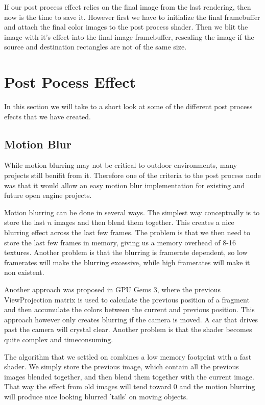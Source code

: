
If our post process effect relies on the final image from the last
rendering, then now is the time to save it. However first we have to
initialize the final framebuffer and attach the final color images to
the post process shader. Then we blit the image with it's effect into
the final image framebuffer, rescaling the image if the source and
destination rectangles are not of the same size.


\section{Post Pocess Effect}

In this section we will take to a short look at some of the different
post process efects that we have created.

\subsection{Motion Blur}

While motion blurring may not be critical to outdoor environments,
many projects still benifit from it. Therefore one of the criteria
to the post process node was that it would allow an easy motion blur
implementation for existing and future open engine projects.

Motion blurring can be done in several ways. The simplest way
conceptually is to store the last $n$ images and then blend them
together. This creates a nice blurring effect across the last few
frames. The problem is that we then need to store the last few frames
in memory, giving us a memory overhead of 8-16 textures. Another
problem is that the blurring is framerate dependent, so low framerates
will make the blurring excessive, while high framerates will make it
non existent.

Another approach was proposed in GPU Gems 3, where the previous
ViewProjection matrix is used to calculate the previous position of a
fragment and then accumulate the colors between the current and
previous position. This approach however only creates blurring if the
camera is moved. A car that drives past the camera will crystal
clear. Another problem is that the shader becomes quite complex and
timeconsuming.

The algorithm that we settled on combines a low memory footprint with
a fast shader. We simply store the previous image, which contain all
the previous images blended together, and then blend them together
with the current image. That way the effect from old images will tend
toward 0 and the motion blurring will produce nice looking blurred
'tails' on moving objects.

